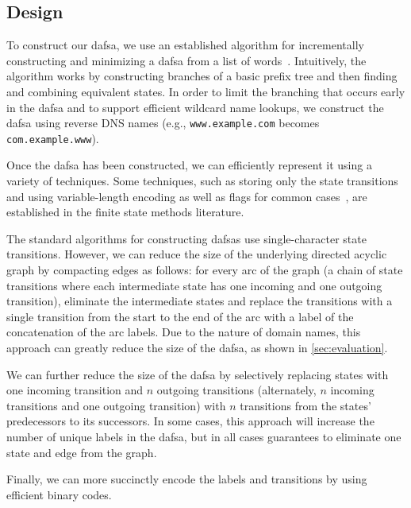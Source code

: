 
\subsection{Design}

To construct our \ac{dafsa}, we use an established algorithm for incrementally
constructing and minimizing a \ac{dafsa} from a list of
words~\cite{daciuk2000incremental}. Intuitively, the algorithm works by
constructing branches of a basic prefix tree and then finding and combining
equivalent states. In order to limit the branching that occurs early in the
\ac{dafsa} and to support efficient wildcard name lookups, we construct the
\ac{dafsa} using reverse DNS names (e.g., \texttt{www.example.com} becomes
\texttt{com.example.www}).

Once the \ac{dafsa} has been constructed, we can efficiently represent it using
a variety of techniques. Some techniques, such as storing only the state
transitions and using variable-length encoding as well as flags for common
cases~\cite{daciuk2012smaller}, are established in the finite state methods
literature.

The standard algorithms for constructing \acp{dafsa} use single-character state
transitions. However, we can reduce the size of the underlying directed acyclic
graph by compacting edges as follows: for every arc of the graph (a chain of
state transitions where each intermediate state has one incoming and one
outgoing transition), eliminate the intermediate states and replace the
transitions with a single transition from the start to the end of the arc with a
label of the concatenation of the arc labels. Due to the nature of domain names,
this approach can greatly reduce the size of the \ac{dafsa}, as shown in
\autoref{sec:evaluation}.

We can further reduce the size of the \ac{dafsa} by selectively replacing states
with one incoming transition and $n$ outgoing transitions (alternately, $n$
incoming transitions and one outgoing transition) with $n$ transitions from the
states' predecessors to its successors. In some cases, this approach will
increase the number of unique labels in the \ac{dafsa}, but in all cases
guarantees to eliminate one state and edge from the graph.

Finally, we can more succinctly encode the labels and transitions by using
efficient binary codes. 



